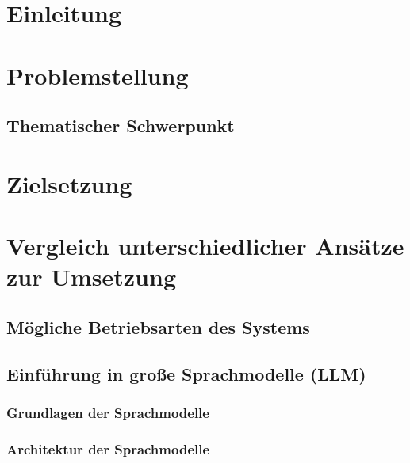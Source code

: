 \documentclass[german,report]{i1thesis}
\begin{document}
\makethetitle%

\maketoc%

\newpage
\section{Einleitung}
\label{sec:einleitung}


\section{Problemstellung}
\label{sec:problemstellung}


\subsection{Thematischer Schwerpunkt}
\label{subsec:thematischer-schwerpunkt}


\section{Zielsetzung}
\label{sec:zielsetzung}



\section{Vergleich unterschiedlicher Ansätze zur Umsetzung}
\label{sec:vergleich}

\subsection{Mögliche Betriebsarten des Systems}




\subsection{Einführung in große Sprachmodelle (LLM)}

\subsubsection{Grundlagen der Sprachmodelle}


\subsubsection{Architektur der Sprachmodelle}
\end{document}
